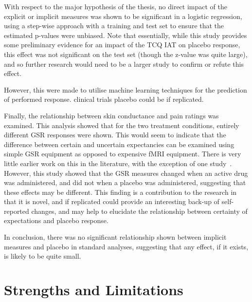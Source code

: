 With respect to the major hypothesis of the thesis, no direct impact
of the explicit or implicit measures was shown to be significant in a
logistic regression, using a step-wise approach with a training and
test set to ensure that the estimated p-values were unbiased. Note
that essentially, while this study provides some preliminary evidence
for an impact of the TCQ IAT on placebo response, this effect was not
significant on the test set (though the z-value was quite large), and
so further research would need to be a larger study to confirm or
refute this effect.

However, this %
were made to utilise machine learning techniques for the prediction of
performed %
response. %
clinical trials %
placebo could be %
if replicated.

Finally, the relationship between skin conductance and pain ratings
was examined. This analysis showed that for the two treatment
conditions, entirely different GSR responses were shown. This would
seem to indicate that the difference between certain and uncertain
expectancies can be examined using simple GSR equipment as opposed to
expensive fMRI equipment. There is very little earlier work on this in
the literature, with the exception of one study~\cite{Fujita2000}.
However, this study showed that the GSR measures changed when an
active drug was administered, and did not when a placebo was
administered, suggesting that these effects may be different. This
finding is a contribution to the research in that it is novel, and if
replicated could provide an interesting back-up of self-reported
changes, and may help to elucidate the relationship between certainty
of expectations and placebo response.

In conclusion, there was no significant relationship shown between
implicit measures and placebo in standard analyses, suggesting that
any effect, if it exists, is likely to be quite small.

\section{Strengths and Limitations}
\label{sec:strengths-limit}

